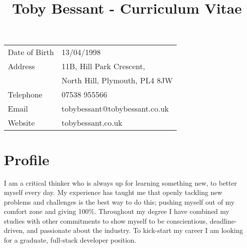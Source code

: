 \documentclass[1pt]{article}
\title{\bfseries\Huge Toby Bessant - Curriculum Vitae\vspace{-1.5em}}
\date{}
\begin{document}
\maketitle
\begin{center}
\begin{tabular}[]{ll}
Date of Birth & 13/04/1998\\
Address        & 11B, Hill Park Crescent,\\ & North Hill, Plymouth, PL4 8JW \\ 
Telephone     &07538 955566\\
Email            & tobybessant@tobybessant.co.uk\\
Website        & tobybessant.co.uk\\
\end{tabular}
\end{center}
 
\section*{Profile}
I am a critical thinker who is always up for learning something new, to better myself every day. My experience has taught me that openly tackling new problems 
and challenges is the best way to do this; pushing myself out of my comfort zone and giving 100\%. Throughout my degree I have combined my studies with 
other commitments to show myself to be conscientious, deadline-driven, and passionate about the industry. To kick-start my career I am looking for a graduate, 
full-stack developer position.
 
\end{document}
